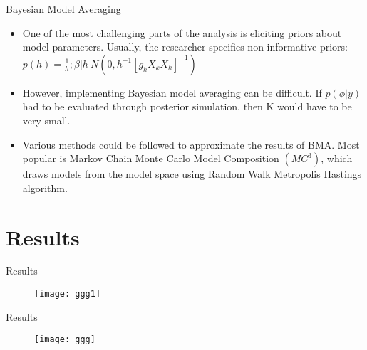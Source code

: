\documentclass[xcolor=dvipsnames]{beamer}
\begin{document}
\begin{frame}{Bayesian Model Averaging}
\begin{itemize}
\item One of the most challenging parts of the analysis is eliciting priors about model parameters. Usually, the researcher specifies non-informative priors:
$p(h)=\frac{1}{h}; \beta{}|h~N(0,h^{-1}[g_kX_kX_k]^{-1})$
\item However, implementing Bayesian model averaging can be difficult. If $p(\phi{}|y)$ had to be evaluated through posterior simulation, then K would have to be very small.
\item Various methods could be followed to approximate the results of BMA. Most popular is Markov Chain Monte Carlo Model Composition $(MC^3)$, which draws models from the model space using Random Walk Metropolis Hastings algorithm.
\end{itemize}
\end{frame}
\section{Results}
\begin{frame}{Results} 
\begin{figure}
\texttt{[image: ggg1]}
\end{figure}
\end{frame}
\begin{frame}{Results} 
\begin{figure}
\texttt{[image: ggg]}
\end{figure}
\end{frame}
\end{document}

